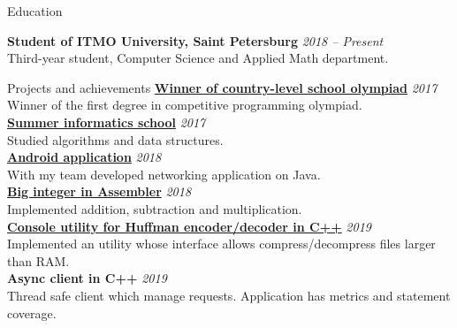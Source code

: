 \documentclass{resume} %
\begin{document}
\begin{rSection}{Education}

{{\bf Student of ITMO University, Saint Petersburg} \hfill {\em 2018 -- Present} 
\\ Third-year student, Computer Science and Applied Math department.}
\end{rSection}
\begin{rSection}{Projects and achievements} 
{\bf \href{http://sesc.nsu.ru/vsesib/inf.html}{Winner of country-level school olympiad}} \hfill {\em 2017} \\
Winner of the first degree in competitive programming olympiad. \\
{{\bf \href{https://olymp.innopolis.ru/shop/}{Summer informatics school}} \hfill {\em 2017} \\
Studied algorithms and data structures. \\}
{{\bf \href{https://github.com/ZloyTapok987/Project}{Android application}} \hfill {\em 2018} \\
With my team developed networking application on Java. \\}
{{\bf \href{https://github.com/DaniilKochergin/CppCourse/tree/master/helloasm}{Big integer in Assembler}} \hfill {\em 2018} \\
Implemented addition, subtraction and multiplication. \\}
{{\bf \href{https://github.com/DaniilKochergin/huffman}{Console utility for Huffman encoder/decoder in C++}} \hfill {\em 2019} \\
Implemented an utility whose interface allows compress/decompress files larger than RAM. \\}
{{\bf Async client in C++} \hfill {\em 2019}  \\
Thread safe client which manage requests. Application has metrics and statement coverage.}
\end{rSection}
\end{document}
